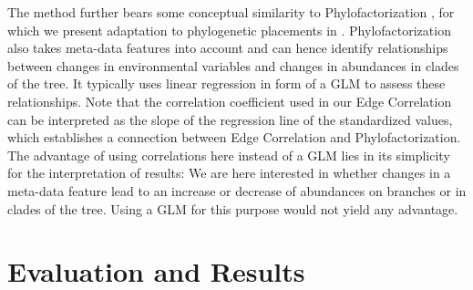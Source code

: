 
The method further bears some conceptual similarity to Phylofactorization \cite{Washburne2017a},
for which we present adaptation to phylogenetic placements in .
Phylofactorization also takes meta-data features into account and can hence identify relationships
between changes in environmental variables and changes in abundances in clades of the tree.
It typically uses linear regression in form of a \acf{GLM} to assess these relationships.
Note that the correlation coefficient used in our Edge Correlation
can be interpreted as the slope of the regression line of the standardized values,
which establishes a connection between Edge Correlation and Phylofactorization.
The advantage of using correlations here instead of a \ac{GLM} lies in its simplicity for the interpretation of results:
We are here interested in whether changes in a meta-data feature
lead to an increase or decrease of abundances on branches or in clades of the tree.
Using a \ac{GLM} for this purpose would not yield any advantage.


\section{Evaluation and Results}
\label{ch:Visualization:sec:Results}


